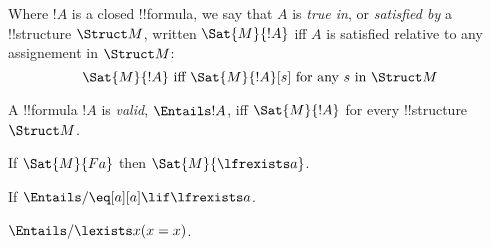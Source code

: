 \documentclass[../../../include/open-logic-section]{subfiles}
\begin{document}
\begin{defn}[Truth]
Where $!A$ is a closed !!{formula}, we say that $A$ is \emph{true in}, or
\emph{satisfied by} a !!{structure} $\Struct M$, written $\Sat{M}{!A}$ iff 
$A$ is satisfied relative to any assignement in $\Struct M$:
$$\Sat{M}{!A}\textrm{ iff }\Sat{M}{!A}[s]\textrm{ for any }s\textrm{ in }\Struct M$$
\end{defn}

\begin{defn}[Validity]
A !!{formula} $!A$ is \emph{valid}, $\Entails !A$, iff $\Sat{M}{!A}$ for every
!!{structure}~$\Struct M$.
\end{defn}

\begin{ex}
If $\Sat{M}{Fa}$ then $\Sat{M}{\lfrexists a}$.
\end{ex}

\begin{ex}
If $\Entails/ \eq[a][a]\lif\lfrexists a$.
\end{ex}

\begin{ex}
$\Entails/ \lexists x (x = x)$.
\end{ex}
\end{document}

